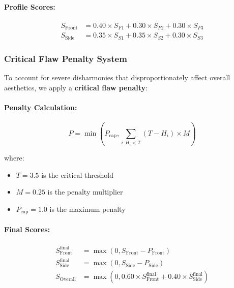 \paragraph{Profile Scores:}

\begin{align}
S_{\text{Front}} &= 0.40 \times S_{F1} + 0.30 \times S_{F2} + 0.30 \times S_{F3} \\
S_{\text{Side}} &= 0.35 \times S_{S1} + 0.35 \times S_{S2} + 0.30 \times S_{S3}
\end{align}

\subsubsection{Critical Flaw Penalty System}

To account for severe disharmonies that disproportionately affect overall aesthetics, we apply a \textbf{critical flaw penalty}:

\paragraph{Penalty Calculation:}

\begin{equation}
P = \min\left(P_{\text{cap}}, \sum_{i: H_i < T} (T - H_i) \times M\right)
\end{equation}

where:
\begin{itemize}
    \item $T = 3.5$ is the critical threshold
    \item $M = 0.25$ is the penalty multiplier
    \item $P_{\text{cap}} = 1.0$ is the maximum penalty
\end{itemize}

\paragraph{Final Scores:}

\begin{align}
S_{\text{Front}}^{\text{final}} &= \max(0, S_{\text{Front}} - P_{\text{Front}}) \\
S_{\text{Side}}^{\text{final}} &= \max(0, S_{\text{Side}} - P_{\text{Side}}) \\
S_{\text{Overall}} &= \max(0, 0.60 \times S_{\text{Front}}^{\text{final}} + 0.40 \times S_{\text{Side}}^{\text{final}})
\end{align}


